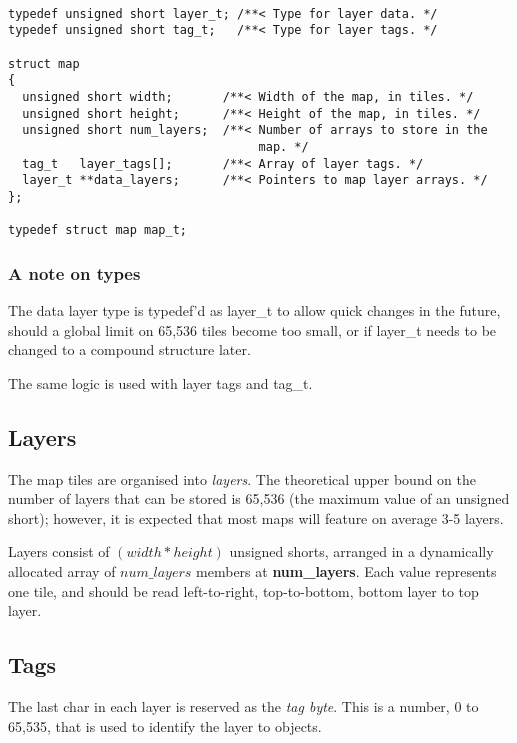\documentclass [12pt,a4paper]{article}
\begin{document}
\begin{lstlisting}

typedef unsigned short layer_t; /**< Type for layer data. */
typedef unsigned short tag_t;   /**< Type for layer tags. */

struct map
{
  unsigned short width;       /**< Width of the map, in tiles. */
  unsigned short height;      /**< Height of the map, in tiles. */
  unsigned short num_layers;  /**< Number of arrays to store in the
                                   map. */
  tag_t   layer_tags[];       /**< Array of layer tags. */
  layer_t **data_layers;      /**< Pointers to map layer arrays. */
};

typedef struct map map_t;

\end{lstlisting}

\subsubsection{A note on types}

The data layer type is typedef'd as layer\_t to allow quick changes in
the future, should a global limit on 65,536 tiles become too small, or
if layer\_t needs to be changed to a compound structure later.

The same logic is used with layer tags and tag\_t.

\subsection{Layers}

The map tiles are organised into \emph{layers}.  The theoretical upper
bound on the number of layers that can be stored is 65,536 (the maximum
value of an unsigned short); however, it is expected that most maps
will feature on average 3-5 layers.

Layers consist of $(width * height)$ unsigned shorts, arranged in a
dynamically allocated array of $num\_layers$ members at
\textbf{num\_layers}.  Each value represents one tile, and should be
read left-to-right, top-to-bottom, bottom layer to top layer.

\subsection{Tags}

The last char in each layer is reserved as the \emph{tag byte}.  This
is a number, 0 to 65,535, that is used to identify the layer to
objects.
\end{document}
